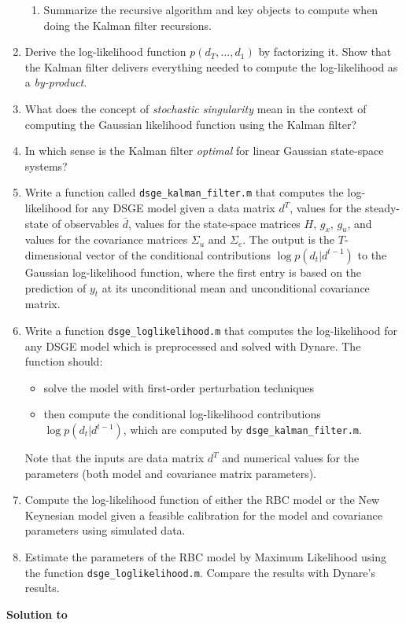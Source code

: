 \begin{enumerate}
\begin{enumerate}
\item Summarize the recursive algorithm and key objects to compute when doing the Kalman filter recursions.

\end{enumerate}

\item Derive the log-likelihood function \(p(d_T,\ldots ,d_1)\) by factorizing it.
Show that the Kalman filter delivers everything needed to compute the log-likelihood as a \emph{by-product}.

\item What does the concept of \emph{stochastic singularity} mean in the context of computing the Gaussian likelihood function using the Kalman filter?

\item In which sense is the Kalman filter \emph{optimal} for linear Gaussian state-space systems?

\item Write a function called \texttt{dsge\_kalman\_filter.m}
  that computes the log-likelihood for any DSGE model given
	a data matrix \(d^T\),
	values for the steady-state of observables \(\bar{d}\),
	values for the state-space matrices \(H\), \(g_x\), \(g_u\),
	and values for the covariance matrices \(\Sigma_u\) and \(\Sigma_e\).
The output is the \(T\)-dimensional vector of the conditional contributions \(\log p(d_t|d^{t-1})\) to the Gaussian log-likelihood function,
  where the first entry is based on the prediction of \(y_t\) at its unconditional mean and unconditional covariance matrix.

\item Write a function \texttt{dsge\_loglikelihood.m} that computes the log-likelihood for any DSGE model
  which is preprocessed and solved with Dynare.
The function should:
\begin{itemize}
\item solve the model with first-order perturbation techniques%
\item then compute the conditional log-likelihood contributions \(\log p(d_t|d^{t-1})\), which are computed by \texttt{dsge\_kalman\_filter.m}.
\end{itemize}
Note that the inputs are data matrix \(d^T\) and numerical values for the parameters (both model and covariance matrix parameters).

\item Compute the log-likelihood function of either the RBC model or the New Keynesian model given a feasible calibration for the model and covariance parameters
  using simulated data.

\item Estimate the parameters of the RBC model by Maximum Likelihood using the function \texttt{dsge\_loglikelihood.m}.
Compare the results with Dynare's results.

\end{enumerate}

\begin{solution}\textbf{Solution to }
\ifDisplaySolutions%

\fi
\newpage
\end{solution}